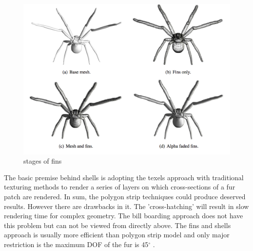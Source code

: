 \begin{figure}[ht!]
\centering
\includegraphics[height=12 cm]{figures/fins.png}
\caption{stages of fins \protect\cite{thesis}}
\label{fig:fins}
\end{figure}
The basic premise behind shells is adopting the texels approach with
traditional texturing methods to render a series of layers on which
cross-sections of a fur patch are rendered\cite{thesis}.
In sum, the polygon strip techniques could produce deserved
results. However there are drawbacks in it. The 'cross-hatching' will
result in slow rendering time for complex geometry. The bill boarding
approach does not have this problem but can not be viewed from
directly above. The fins and shells approach is usually more efficient
than polygon strip model and only major restriction is the maximum
DOF of the fur is 45$^\circ$ \cite{fur}.
